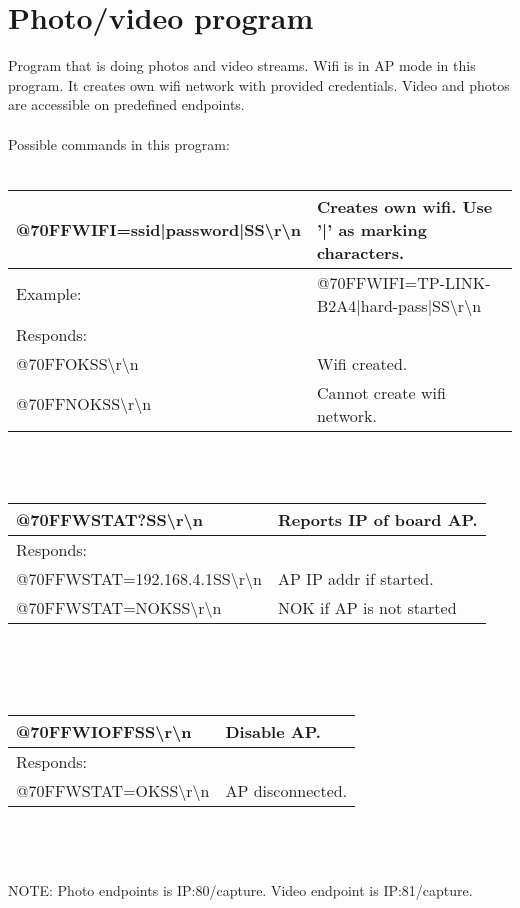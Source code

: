 \documentclass[a4paper,12pt]{article}
\begin{document}
\section{Photo/video program}
Program that is doing photos and video streams. Wifi is in AP mode in this program. It creates own wifi network with provided credentials. Video and photos are accessible on predefined endpoints. \\
\\
Possible commands in this program: \\
\\
\begin{tabular}{|l|l|}
\hline
 @70FFWIFI=ssid|password|SS\textbackslash r\textbackslash n & Creates own wifi. Use '|' as marking characters. \\
\hline
 Example: & @70FFWIFI=TP-LINK-B2A4|hard-pass|SS\textbackslash r\textbackslash n \\
\hline
 Responds: &\\ 
 @70FFOKSS\textbackslash r\textbackslash n & Wifi created. \\
 @70FFNOKSS\textbackslash r\textbackslash n & Cannot create wifi network. \\
\hline
\end{tabular} \\ \\
\begin{tabular}{|l|l|}
\hline
 @70FFWSTAT?SS\textbackslash r\textbackslash n & Reports IP of board AP. \\
\hline
 Responds: &\\ 
 @70FFWSTAT=192.168.4.1SS\textbackslash r\textbackslash n & AP IP addr if started. \\
 @70FFWSTAT=NOKSS\textbackslash r\textbackslash n & NOK if AP is not started \\
\hline
\end{tabular} \\ \\
\\
\begin{tabular}{|l|l|}
\hline
 @70FFWIOFFSS\textbackslash r\textbackslash n & Disable AP. \\
\hline
 Responds: &\\ 
 @70FFWSTAT=OKSS\textbackslash r\textbackslash n & AP disconnected. \\
\hline
\end{tabular} \\ \\
\\
NOTE: Photo endpoints is IP:80/capture. Video endpoint is IP:81/capture.
\\
\end{document}
